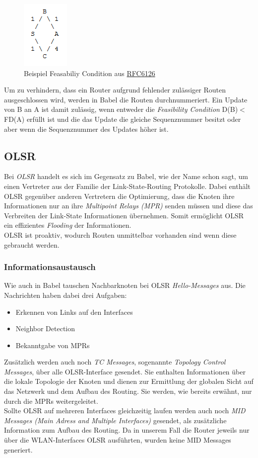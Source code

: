 \documentclass[10pt]{scrartcl}
\begin{document}
\begin{figure}[htbp]
	\centering	\includegraphics{Grafiken/Feasibility.png}
	\caption{Beispiel Feasabiliy Condition aus \href{http://tools.ietf.org/html/rfc6126}{RFC6126}}
	\label{fig:Feasibility}
\end{figure} 

Um zu verhindern, dass ein Router aufgrund fehlender zulässiger Routen ausgeschlossen wird, werden in Babel die Routen durchnummeriert. Ein Update von B an A ist damit zulässig, wenn entweder die \textit{Feasibility Condition} D(B)$<$FD(A) erfüllt ist und die das Update die gleiche Sequenznummer besitzt oder aber wenn die Sequenznummer des Updates höher ist.


\subsection{OLSR}
Bei \textit{OLSR} handelt es sich im Gegensatz zu Babel, wie der Name schon sagt, um einen Vertreter aus der Familie der Link-State-Routing Protokolle.
Dabei enthält OLSR gegenüber anderen Vertretern die Optimierung, dass die Knoten ihre Informationen nur an ihre \textit{Multipoint Relays (MPR)} senden müssen und diese das Verbreiten der Link-State Informationen übernehmen.
Somit ermöglicht OLSR ein effizientes \textit{Flooding} der Informationen.\\
OLSR ist proaktiv, wodurch Routen unmittelbar vorhanden sind wenn diese gebraucht werden.

\subsubsection{Informationsaustausch}
Wie auch in Babel tauschen Nachbarknoten bei OLSR \textit{Hello-Messages} aus.
Die Nachrichten haben dabei drei Aufgaben:
\begin{itemize}
	\item Erkennen von Links auf den Interfaces
	\item Neighbor Detection
	\item Bekanntgabe von MPRs
\end{itemize}
Zusätzlich werden auch noch \textit{TC Messages}, sogenannte \textit{Topology Control Messages}, über alle OLSR-Interface gesendet.
Sie enthalten Informationen über die lokale Topologie der Knoten und dienen zur Ermittlung der globalen Sicht auf das Netzwerk und dem Aufbau des Routing.
Sie werden, wie bereits erwähnt, nur durch die MPRs weitergeleitet.\\
Sollte OLSR auf mehreren Interfaces gleichzeitig laufen werden auch noch \textit{MID Messages (Main Adress and Multiple Interfaces)} gesendet, als zusätzliche Information zum Aufbau des Routing.
Da in unserem Fall die Router jeweils nur über die WLAN-Interfaces OLSR ausführten, wurden keine MID Messages generiert.\\
\end{document}

